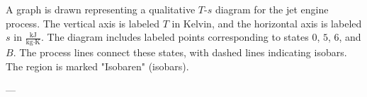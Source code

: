 A graph is drawn representing a qualitative \( T \)-\( s \) diagram for the jet engine process. The vertical axis is labeled \( T \) in Kelvin, and the horizontal axis is labeled \( s \) in \( \frac{\text{kJ}}{\text{kg·K}} \). The diagram includes labeled points corresponding to states \( 0 \), \( 5 \), \( 6 \), and \( B \). The process lines connect these states, with dashed lines indicating isobars. The region is marked "Isobaren" (isobars).  

---